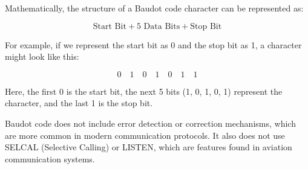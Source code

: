 Mathematically, the structure of a Baudot code character can be represented as:

\[
\text{Start Bit} + \text{5 Data Bits} + \text{Stop Bit}
\]

For example, if we represent the start bit as 0 and the stop bit as 1, a character might look like this:

\[
0 \quad 1 \quad 0 \quad 1 \quad 0 \quad 1 \quad 1
\]

Here, the first 0 is the start bit, the next 5 bits (1, 0, 1, 0, 1) represent the character, and the last 1 is the stop bit.

Baudot code does not include error detection or correction mechanisms, which are more common in modern communication protocols. It also does not use SELCAL (Selective Calling) or LISTEN, which are features found in aviation communication systems.

